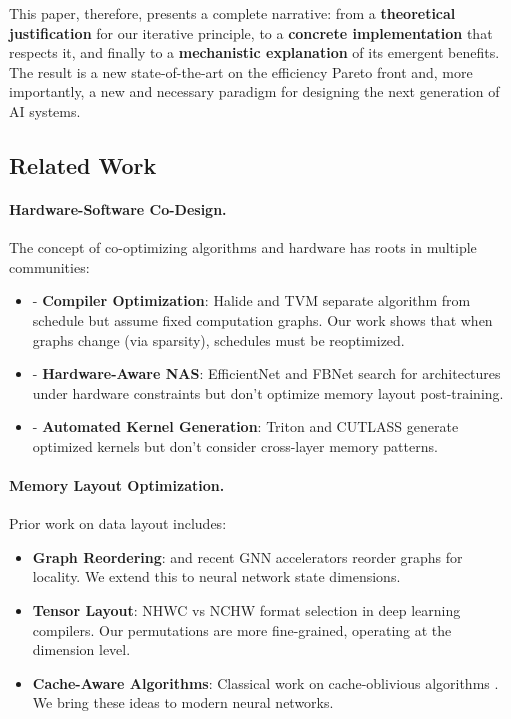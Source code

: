 \documentclass{article}
\begin{document}
This paper, therefore, presents a complete narrative: from a \textbf{theoretical justification} for our iterative principle, to a \textbf{concrete implementation} that respects it, and finally to a \textbf{mechanistic explanation} of its emergent benefits. The result is a new state-of-the-art on the efficiency Pareto front and, more importantly, a new and necessary paradigm for designing the next generation of AI systems.

\subsection{Related Work}

\paragraph{Hardware-Software Co-Design.}
The concept of co-optimizing algorithms and hardware has roots in multiple communities:
\begin{itemize}
    \item - \textbf{Compiler Optimization}: Halide \cite{ragan2013halide} and TVM \cite{chen2018tvm} separate algorithm from schedule but assume fixed computation graphs. Our work shows that when graphs change (via sparsity), schedules must be reoptimized.
    \item - \textbf{Hardware-Aware NAS}: EfficientNet \cite{tan2019efficientnetrm} and FBNet \cite{Wu2018FBNetHE} search for architectures under hardware constraints but don't optimize memory layout post-training.
    \item - \textbf{Automated Kernel Generation}: Triton \cite{Tillet2019TritonAI} and CUTLASS generate optimized kernels but don't consider cross-layer memory patterns.
\end{itemize}

\paragraph{Memory Layout Optimization.}
Prior work on data layout includes:
\begin{itemize}
    \item \textbf{Graph Reordering}: \cite{karypis1997metis} and recent GNN accelerators \cite{Zhang2021UnderstandingGC} reorder graphs for locality. We extend this to neural network state dimensions.
    \item \textbf{Tensor Layout}: NHWC vs NCHW format selection in deep learning compilers. Our permutations are more fine-grained, operating at the dimension level.
    \item \textbf{Cache-Aware Algorithms}: Classical work on cache-oblivious algorithms \cite{frigo1999cacheobliviousalgorithms}. We bring these ideas to modern neural networks.
\end{itemize}
\end{document}
